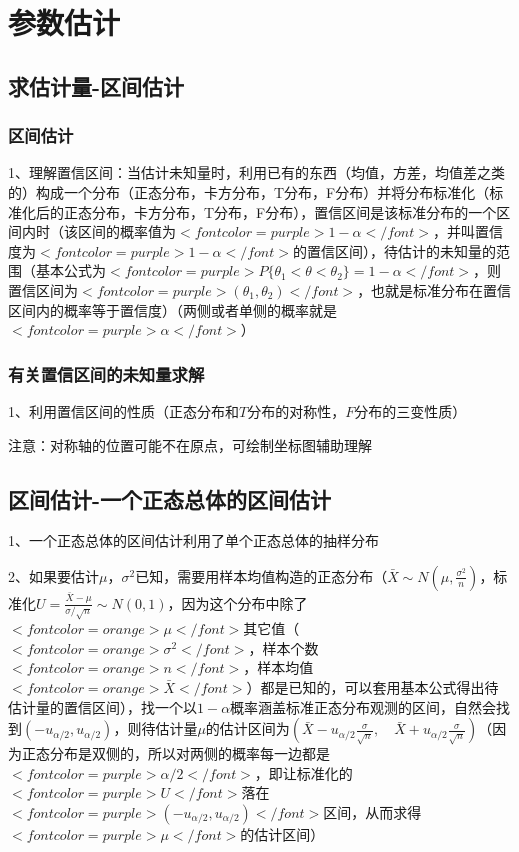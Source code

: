 \chapter{参数估计}

\section{求估计量-区间估计}



\subsection{区间估计}

1、理解置信区间：当估计未知量时，利用已有的东西（均值，方差，均值差之类的）构成一个分布（正态分布，卡方分布，T分布，F分布）并将分布标准化（标准化后的正态分布，卡方分布，T分布，F分布），置信区间是该标准分布的一个区间内时（该区间的概率值为$ <font color=purple>1-\alpha</font> $，并叫置信度为$ <font color=purple>1-\alpha</font> $的置信区间），待估计的未知量的范围（基本公式为$ <font color=purple>P\{ \theta_1 < \theta < \theta_2 \} = 1-\alpha</font> $，则置信区间为$ <font color=purple>(\theta_1 , \theta_2)</font> $，也就是标准分布在置信区间内的概率等于置信度）（两侧或者单侧的概率就是$ <font color=purple>\alpha</font> $）



\subsection{有关置信区间的未知量求解}

1、利用置信区间的性质（正态分布和$ T $分布的对称性，$ F $分布的三变性质）

注意：对称轴的位置可能不在原点，可绘制坐标图辅助理解

\section{区间估计-一个正态总体的区间估计}

1、一个正态总体的区间估计利用了单个正态总体的抽样分布

2、如果要估计$ \mu $，$ \sigma^{2} $已知，需要用样本均值构造的正态分布（$ \bar{X} \sim N\left(\mu, \frac{\sigma^{2}}{n}\right) $，标准化$ U=\frac{\bar{X}-\mu}{\sigma / \sqrt{n}} \sim N(0,1) $，因为这个分布中除了$ <font color=orange>\mu</font> $其它值（$ <font color=orange>\sigma^{2}</font> $，样本个数$ <font color=orange>n</font> $，样本均值$ <font color=orange>\bar{X}</font> $）都是已知的，可以套用基本公式得出待估计量的置信区间），找一个以$ 1−α $概率涵盖标准正态分布观测的区间，自然会找到$ (−u_{\alpha/2},u_{\alpha/2}) $，则待估计量$ \mu $的估计区间为$ \left(\bar{X}-u_{{\alpha}/{2}} \frac{\sigma}{\sqrt{n}}, \quad \bar{X}+u_{{\alpha}/{2}} \frac{\sigma}{\sqrt{n}}\right)  $（因为正态分布是双侧的，所以对两侧的概率每一边都是$ <font color=purple>\alpha/2</font> $，即让标准化的$ <font color=purple>U</font> $落在$ <font color=purple>(-u_{{\alpha}/{2}},u_{{\alpha}/{2}})</font> $区间，从而求得$ <font color=purple>\mu</font> $的估计区间）

